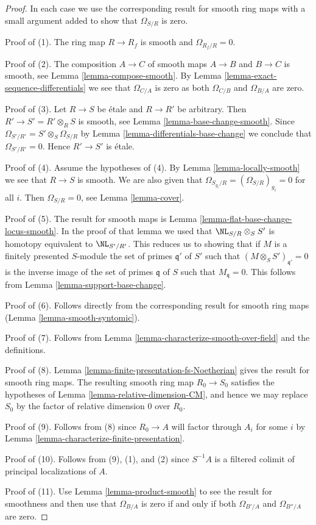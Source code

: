 \begin{proof}
In each case we use the corresponding result for smooth ring maps with
a small argument added to show that $\Omega_{S/R}$ is zero.

\medskip\noindent
Proof of (1). The ring map $R \to R_f$ is smooth and $\Omega_{R_f/R} = 0$.

\medskip\noindent
Proof of (2). The composition $A \to C$ of smooth maps $A \to B$ and
$B \to C$ is smooth, see Lemma \ref{lemma-compose-smooth}. By
Lemma \ref{lemma-exact-sequence-differentials} we see that
$\Omega_{C/A}$ is zero as both $\Omega_{C/B}$ and $\Omega_{B/A}$ are zero.

\medskip\noindent
Proof of (3). Let $R \to S$ be \'etale and $R \to R'$ be arbitrary.
Then $R' \to S' = R' \otimes_R S$ is smooth, see
Lemma \ref{lemma-base-change-smooth}. Since
$\Omega_{S'/R'} = S' \otimes_S \Omega_{S/R}$ by
Lemma \ref{lemma-differentials-base-change}
we conclude that $\Omega_{S'/R'} = 0$. Hence $R' \to S'$ is \'etale.

\medskip\noindent
Proof of (4). Assume the hypotheses of (4). By
Lemma \ref{lemma-locally-smooth} we see that $R \to S$ is smooth.
We are also given that $\Omega_{S_{g_i}/R} = (\Omega_{S/R})_{g_i} = 0$
for all $i$. Then $\Omega_{S/R} = 0$, see Lemma \ref{lemma-cover}.

\medskip\noindent
Proof of (5). The result for smooth maps is
Lemma \ref{lemma-flat-base-change-locus-smooth}.
In the proof of that lemma we used that $\NL_{S/R} \otimes_S S'$
is homotopy equivalent to $\NL_{S'/R'}$.
This reduces us to showing that if $M$ is a finitely presented
$S$-module the set of primes $\mathfrak q'$ of $S'$
such that $(M \otimes_S S')_{\mathfrak q'} = 0$ is the inverse
image of the set of primes $\mathfrak q$ of $S$ such that
$M_{\mathfrak q} = 0$. This follows from Lemma \ref{lemma-support-base-change}.

\medskip\noindent
Proof of (6). Follows directly from the corresponding result for
smooth ring maps (Lemma \ref{lemma-smooth-syntomic}).

\medskip\noindent
Proof of (7). Follows from Lemma \ref{lemma-characterize-smooth-over-field}
and the definitions.

\medskip\noindent
Proof of (8). Lemma \ref{lemma-finite-presentation-fs-Noetherian}
gives the result for smooth ring maps. The resulting smooth ring map
$R_0 \to S_0$ satisfies the
hypotheses of Lemma \ref{lemma-relative-dimension-CM}, and hence we may
replace $S_0$ by the factor of relative dimension $0$ over $R_0$.

\medskip\noindent
Proof of (9). Follows from (8) since $R_0 \to A$ will factor through
$A_i$ for some $i$ by Lemma \ref{lemma-characterize-finite-presentation}.

\medskip\noindent
Proof of (10). Follows from (9), (1), and (2) since $S^{-1}A$ is a
filtered colimit of principal localizations of $A$.

\medskip\noindent
Proof of (11). Use Lemma \ref{lemma-product-smooth} to see the
result for smoothness and then use that $\Omega_{B/A}$
is zero if and only if both $\Omega_{B'/A}$ and $\Omega_{B''/A}$
are zero.
\end{proof}
